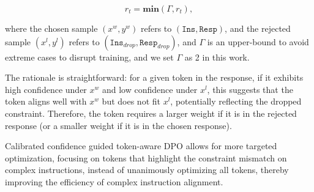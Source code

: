 \vspace{-4mm}
\begin{equation}
    r_t = \mathbf{min}(\Gamma, r_t),
\end{equation}
\vspace{-4mm}


\noindent where the chosen sample $(x^{w}, y^{w})$ refers to $(\texttt{Ins}, \texttt{Resp})$, and the rejected sample $(x^{l}, y^{l})$ refers to $(\texttt{Ins}_{drop}, \texttt{Resp}_{drop})$, and $\Gamma$ is an upper-bound to avoid extreme cases to disrupt training, and we set $\Gamma$ as 2 in this work.

The rationale is straightforward: for a given token in the response, if it exhibits high confidence under $x^{w}$ and low confidence under $x^{l}$, this suggests that the token aligns well with $x^{w}$ but does not fit $x^{l}$, potentially reflecting the dropped constraint. Therefore, the token requires a larger weight if it is in the rejected response (or a smaller weight if it is in the chosen response).


Calibrated confidence guided token-aware DPO allows for more targeted optimization, focusing on tokens that highlight the constraint mismatch on complex instructions, instead of unanimously optimizing all tokens, thereby improving the efficiency of complex instruction alignment.